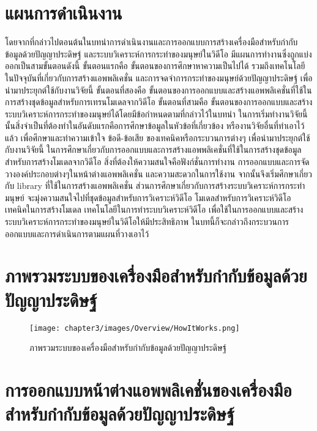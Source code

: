 \section{แผนการดำเนินงาน}
โดยจากที่กล่าวไปตอนต้นในบทนำการดำเนินงานและการออกแบบการสร้างเครื่องมือสำหรับกำกับข้อมูลด้วยปัญญาประดิษฐ์
และระบบวิเคราะห์การกระทำของมนุษย์ในวิดีโอ มีแผนการทำงานซึ่งถูกแบ่งออกเป็นสามขั้นตอนดังนี้ 
ขั้นตอนแรกคือ ขั้นตอนของการศึกษาหาความเป็นไปได้ รวมถึงเทคโนโลยีในปัจจุบันที่เกี่ยวกับการสร้างแอพพลิเคชั่น และการจดจำการกระทำของมนุษย์ด้วยปัญญาประดิษฐ์ เพื่อนำมาประยุกต์ใช้กับงานวิจัยนี้
ขั้นตอนที่สองคือ ขั้นตอนของการออกแบบและสร้างแอพพลิเคชั่นที่ใช้ในการสร้างชุดข้อมูลสำหรับการเทรนโมเดลจากวิดีโอ
ขั้นตอนที่สามคือ ขั้นตอนของการออกแบบและสร้างระบบวิเคราะห์การกระทำของมนุษย์ได้โดยมีข้อกำหนดตามที่กล่าวไว้ในบทนำ
ในการเริ่มทำงานวิจัยนี้นั้นสิ่งจำเป็นที่ต้องทำในอันดับแรกคือการศึกษาข้อมูลในหัวข้อที่เกี่ยวข้อง หรืองานวิจัยอื่นที่ทำเอาไว้แล้ว
เพื่อศึกษาและทำความเข้าใจ ข้อดี-ข้อเสีย ของเทคนิคหรือกระบวนการต่างๆ เพื่อนำมาประยุกต์ใช้กับงานวิจัยนี้
ในการศึกษาเกี่ยวกับการออกแบบและการสร้างแอพพลิเคชั่นที่ใช้ในการสร้างชุดข้อมูลสำหรับการสร้างโมเดลจากวิดีโอ 
สิ่งที่ต้องให้ความสนใจคือฟังก์ชั่นการทำงาน การออกแบบและการจัดวางองค์ประกอบต่างๆในหน้าต่างแอพพลิเคชั่น
และความสะดวกในการใช้งาน จากนั้นจึงเริ่มศึกษาเกี่ยวกับ library ที่ใช้ในการสร้างแอพพลิเคชั่น
ส่วนการศึกษาเกี่ยวกับการสร้างระบบวิเคราะห์การกระทำมนุษย์ จะมุ่งความสนใจไปที่ชุดข้อมูลสำหรับการวิเคราะห์วิดีโอ
โมเดลสำหรับการวิเคราะห์วิดีโอ เทคนิคในการสร้างโมเดล เทคโนโลยีในการทำระบบวิเคราะห์วิดีโอ
เพื่อใช้ในการออกแบบและสร้างระบบวิเคราะห์การกระทำของมนุษย์ในวิดีโอให้มีประสิทธิภาพ
ในบทนี้ก็จะกล่าวถึงกระบวนการออกแบบและการดำเนินการตามแผนที่วางเอาไว้

\clearpage
\section{ภาพรวมระบบของเครื่องมือสำหรับกำกับข้อมูลด้วยปัญญาประดิษฐ์}
\begin{figure}[!ht]
    \centering
    \texttt{[image: chapter3/images/Overview/HowItWorks.png]}
    \caption{ภาพรวมระบบของเครื่องมือสำหรับกำกับข้อมูลด้วยปัญญาประดิษฐ์}
    \label{fig:labeling_overview}
\end{figure}

\clearpage

\section{การออกแบบหน้าต่างแอพพลิเคชั่นของเครื่องมือสำหรับกำกับข้อมูลด้วยปัญญาประดิษฐ์}

\clearpage

